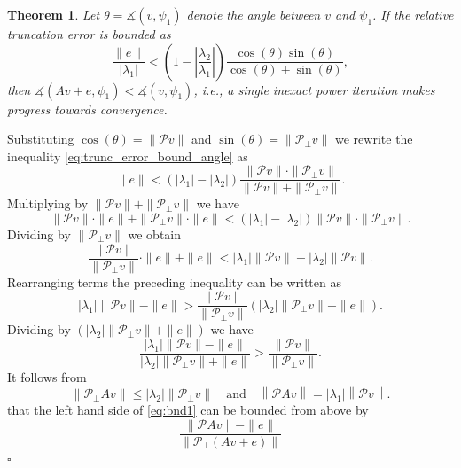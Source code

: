 \documentclass[10pt,preprint]{elsarticle}
\newtheorem{theorem}{\bf Theorem}[section]
\newenvironment{proof}{{\noindent \bf \em Proof:}}{\hfill$\square$}
\def\P{\mathcal{P}}
\begin{document}
\begin{theorem} \label{thm:pwr_convergence} 
Let $\theta = \measuredangle(v,\psi_1)$ denote the angle between $v$ and $\psi_1$. If the relative truncation error is bounded as 
\begin{equation} \label{eq:trunc_error_bound_angle}
    \frac{\|e\|}{|\lambda_1|} < \left(1 - \left|\frac{\lambda_2}{\lambda_1}\right|\right)
    \frac{\cos(\theta) \sin(\theta)}{\cos(\theta) + \sin(\theta)}, 
\end{equation}
then $\measuredangle(Av+e,\psi_1) < \measuredangle(v,\psi_1)$, i.e., a single inexact power iteration makes progress towards convergence. 
\end{theorem}
\begin{proof}
Substituting $\cos(\theta) = \|\P v\|$ and $\sin(\theta)=\|\P_{\perp}v\|$ we rewrite the inequality \eqref{eq:trunc_error_bound_angle} as 
\begin{equation}
\|e\| < \left(|\lambda_1| - |\lambda_2| \right)\frac{\|\P v\| \cdot \|\P_{\perp} v\|}{\|\P v\| + \|\P_{\perp} v\|}. 
\end{equation}
Multiplying by $\|\P v\| + \|\P_{\perp} v\|$ we have 
$$
\|\P v\|\cdot \|e\| + \|\P_{\perp} v\| \cdot \|e\| < \left(|\lambda_1| - |\lambda_2| \right) \|\P v\| \cdot \|\P_{\perp} v\|. 
$$
Dividing by $\|\P_{\perp} v\|$ we obtain 
$$
\frac{\|\P v\|}{\|\P_{\perp} v\|} \cdot \|e\| + \|e\| < |\lambda_1| \|\P v\| - |\lambda_2|\|\P v\|. 
$$
Rearranging terms the preceding inequality can be written as 
$$
|\lambda_1| \|\P v\| - \|e\| > \frac{\|\P v\|}{\|\P_{\perp} v\|} \left( |\lambda_2| \|\P_{\perp} v\| + \|e\|\right). 
$$
Dividing by $\left( |\lambda_2| \|\P_{\perp} v\| + \|e\|\right)$ we have 
\begin{equation} \label{eq:bnd1}
\frac{|\lambda_1| \|\P v\| - \|e\|}{|\lambda_2| \|\P_{\perp} v\| + \|e\|} > \frac{\|\P v\|}{\|\P_{\perp} v\|}. 
\end{equation}
%
It follows from 
\begin{equation} 
\left\| \P_{\perp} Av \right\| \leq  |\lambda_2|\left\|\P_{\perp} v\right\|
\quad \text{and} \quad 
\left\| \P Av \right\| = |\lambda_1|\left\|\P v\right\|. 
\end{equation} 
that the left hand side of \eqref{eq:bnd1} can be bounded from above by 
\begin{equation} \label{eq:ineq1}
\frac{\| \P Av\| - \|e\|}{ \left\|\P_{\perp} \left(Av + e\right) \right\|} 

\end{equation}
\end{proof}
\end{document}
